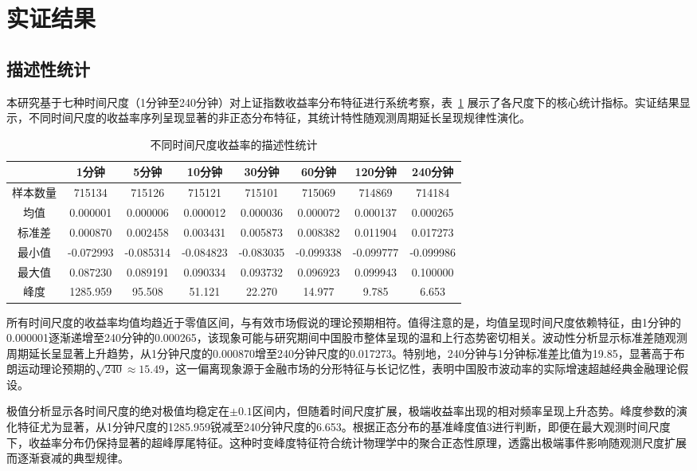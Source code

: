 \documentclass[12pt, a4paper]{article}
\begin{document}
\section{实证结果}

\subsection{描述性统计}

本研究基于七种时间尺度（1分钟至240分钟）对上证指数收益率分布特征进行系统考察，表~\ref{tab:descriptive_stats} 展示了各尺度下的核心统计指标。实证结果显示，不同时间尺度的收益率序列呈现显著的非正态分布特征，其统计特性随观测周期延长呈现规律性演化。

\begin{table}[htbp]
\centering
\caption{不同时间尺度收益率的描述性统计}
\label{tab:descriptive_stats}
\begin{tabular}{cccccccc}
\toprule
& 1分钟 & 5分钟 & 10分钟 & 30分钟 & 60分钟 & 120分钟 & 240分钟 \\
\midrule
样本数量 & 715134 & 715126 & 715121 & 715101 & 715069 & 714869 & 714184 \\
均值 & 0.000001 & 0.000006 & 0.000012 & 0.000036 & 0.000072 & 0.000137 & 0.000265 \\
标准差 & 0.000870 & 0.002458 & 0.003431 & 0.005873 & 0.008382 & 0.011904 & 0.017273 \\
最小值 & -0.072993 & -0.085314 & -0.084823 & -0.083035 & -0.099338 & -0.099777 & -0.099986 \\
最大值 & 0.087230 & 0.089191 & 0.090334 & 0.093732 & 0.096923 & 0.099943 & 0.100000 \\
峰度 & 1285.959 & 95.508 & 51.121 & 22.270 & 14.977 & 9.785 & 6.653 \\
\bottomrule
\end{tabular}
\end{table}

所有时间尺度的收益率均值均趋近于零值区间，与有效市场假说的理论预期相符。值得注意的是，均值呈现时间尺度依赖特征，由1分钟的0.000001逐渐递增至240分钟的0.000265，该现象可能与研究期间中国股市整体呈现的温和上行态势密切相关。波动性分析显示标准差随观测周期延长呈显著上升趋势，从1分钟尺度的0.000870增至240分钟尺度的0.017273。特别地，240分钟与1分钟标准差比值为19.85，显著高于布朗运动理论预期的$\sqrt{240} \approx 15.49$，这一偏离现象源于金融市场的分形特征与长记忆性，表明中国股市波动率的实际增速超越经典金融理论假设。

极值分析显示各时间尺度的绝对极值均稳定在$\pm0.1$区间内，但随着时间尺度扩展，极端收益率出现的相对频率呈现上升态势。峰度参数的演化特征尤为显著，从1分钟尺度的1285.959锐减至240分钟尺度的6.653。根据正态分布的基准峰度值3进行判断，即便在最大观测时间尺度下，收益率分布仍保持显著的超峰厚尾特征。这种时变峰度特征符合统计物理学中的聚合正态性原理，透露出极端事件影响随观测尺度扩展而逐渐衰减的典型规律。
\end{document}
